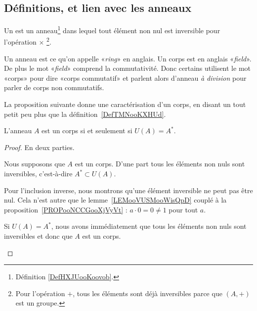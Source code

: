 \subsection{Définitions, et lien avec les anneaux}

\begin{definition}  \label{DefTMNooKXHUd}
    Un  est un anneau\footnote{Définition \ref{DefHXJUooKoovob}.} dans lequel tout élément non nul est inversible pour l'opération \( \times\) \footnote{Pour l'opération \( +\), tous les éléments sont déjà inversibles parce que \( (A,+)\) est un groupe.}.
\end{definition}

\begin{remark}      \label{REMooYRNUooYgBBKF}
    Un anneau est ce qu'on appelle «\emph{ring}» en anglais. Un corps est en anglais «\emph{field}». De plus le mot «\emph{field}» comprend la commutativité. Donc certains utilisent le mot «corps» pour dire «corps commutatif» et parlent alors d'anneau \emph{à division} pour parler de corps non commutatifs.
\end{remark}

La proposition suivante donne une caractérisation d'un corps, en disant un tout petit peu plus que la définition~\ref{DefTMNooKXHUd}.
\begin{proposition}
    L'anneau $A$ est un corps si et seulement si \( U(A) = A^* \).
\end{proposition}

\begin{proof}
    En deux parties.
    \begin{subproof}
        \item[Sens direct]
            Nous supposons que \( A\) est un corps. D'une part tous les éléments non nuls sont inversibles, c'est-à-dire \( A^*\subset U(A)\).
            
            Pour l'inclusion inverse, nous montrons qu'une élément inversible ne peut pas être nul. Cela n'est autre que le lemme~\ref{LEMooVUSMooWisQpD} couplé à la proposition~\ref{PROPooNCCGooXjVyVt} : \( a\cdot 0=0\neq 1\) pour tout \( a\).
        \item[Sens inverse]
            Si \( U(A)=A^*\), nous avons immédiatement que tous les éléments non nuls sont inversibles et donc que \( A\) est un corps.
    \end{subproof}
\end{proof}


